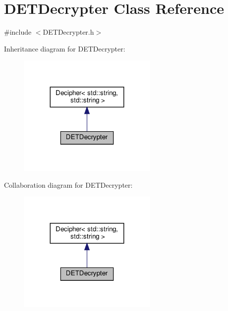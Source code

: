 \hypertarget{classDETDecrypter}{}\section{D\+E\+T\+Decrypter Class Reference}
\label{classDETDecrypter}


{\ttfamily \#include $<$D\+E\+T\+Decrypter.\+h$>$}



Inheritance diagram for D\+E\+T\+Decrypter\+:\nopagebreak
\begin{figure}[H]
\begin{center}
\leavevmode
\includegraphics[width=191pt]{classDETDecrypter__inherit__graph}
\end{center}
\end{figure}


Collaboration diagram for D\+E\+T\+Decrypter\+:\nopagebreak
\begin{figure}[H]
\begin{center}
\leavevmode
\includegraphics[width=191pt]{classDETDecrypter__coll__graph}
\end{center}
\end{figure}

